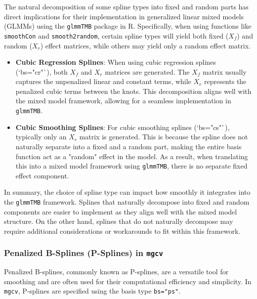 \documentclass[12pt, twoside,hidelinks]{article}
\theoremstyle{definition}
\numberwithin{equation}{section}
\begin{document}
The natural decomposition of some spline types into fixed and random parts has direct implications for their implementation in generalized linear mixed models (GLMMs) using the \texttt{glmmTMB} package in R. Specifically, when using functions like \texttt{smoothCon} and \texttt{smooth2random}, certain spline types will yield both fixed (\(X_f\)) and random (\(X_r\)) effect matrices, while others may yield only a random effect matrix.

\begin{itemize}
    \item \textbf{Cubic Regression Splines}: When using cubic regression splines (`bs="cr"`), both \(X_f\) and \(X_r\) matrices are generated. The \(X_f\) matrix usually captures the unpenalized linear and constant terms, while \(X_r\) represents the penalized cubic terms between the knots. This decomposition aligns well with the mixed model framework, allowing for a seamless implementation in \texttt{glmmTMB}.
    
    \item \textbf{Cubic Smoothing Splines}: For cubic smoothing splines (`bs="cs"`), typically only an \(X_r\) matrix is generated. This is because the spline does not naturally separate into a fixed and a random part, making the entire basis function act as a "random" effect in the model. As a result, when translating this into a mixed model framework using \texttt{glmmTMB}, there is no separate fixed effect component.
\end{itemize}

In summary, the choice of spline type can impact how smoothly it integrates into the \texttt{glmmTMB} framework. Splines that naturally decompose into fixed and random components are easier to implement as they align well with the mixed model structure. On the other hand, splines that do not naturally decompose may require additional considerations or workarounds to fit within this framework.



\subsubsection{Penalized B-Splines (P-Splines) in \texttt{mgcv}}

Penalized B-splines, commonly known as P-splines, are a versatile tool for smoothing and are often used for their computational efficiency and simplicity. In \texttt{mgcv}, P-splines are specified using the basis type \texttt{bs="ps"}.
\end{document}
